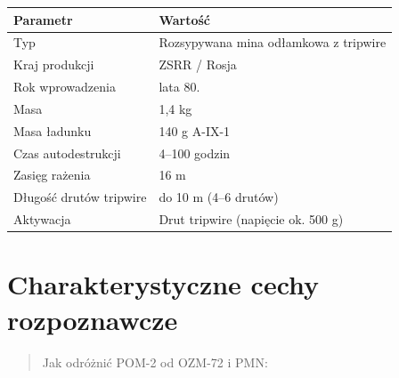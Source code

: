 \documentclass[12pt,openany,oneside]{book}
\begin{document}
\begin{longtable}[]{@{}ll@{}}
\toprule\noalign{}
Parametr & Wartość \\
\midrule\noalign{}
\endhead
\bottomrule\noalign{}
\endlastfoot
Typ & Rozsypywana mina odłamkowa z tripwire \\
Kraj produkcji & ZSRR / Rosja \\
Rok wprowadzenia & lata 80. \\
Masa & 1,4 kg \\
Masa ładunku & 140 g A-IX-1 \\
Czas autodestrukcji & 4--100 godzin \\
Zasięg rażenia & 16 m \\
Długość drutów tripwire & do 10 m (4--6 drutów) \\
Aktywacja & Drut tripwire (napięcie ok. 500 g) \\
\end{longtable}

\section{Charakterystyczne cechy
rozpoznawcze}\label{charakterystyczne-cechy-rozpoznawcze-110}

\begin{quote}
Jak odróżnić POM-2 od OZM-72 i PMN:
\end{quote}
\end{document}
